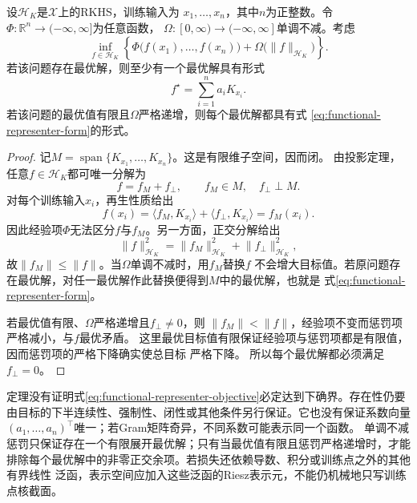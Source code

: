 \begin{theorem}[有限样本表示定理]
\label{thm:functional-representer-theorem}
设$\mathcal{H}_K$是$\mathcal{X}$上的RKHS，训练输入为
$x_1,\ldots,x_n$，其中$n$为正整数。令
$\Phi:\mathbb{R}^n\to(-\infty,\infty]$为任意函数，
$\Omega:[0,\infty)\to(-\infty,\infty]$单调不减。考虑
\begin{equation}
  \inf_{f\in\mathcal{H}_K}
  \left\{
    \Phi\bigl(f(x_1),\ldots,f(x_n)\bigr)
    +
    \Omega\bigl(\lVert f\rVert_{\mathcal{H}_K}\bigr)
  \right\}.
  \label{eq:functional-representer-objective}
\end{equation}
若该问题存在最优解，则至少有一个最优解具有形式
\begin{equation}
  f^\star
  =
  \sum_{i=1}^{n}a_iK_{x_i}.
  \label{eq:functional-representer-form}
\end{equation}
若该问题的最优值有限且$\Omega$严格递增，则每个最优解都具有式
\eqref{eq:functional-representer-form}的形式。
\end{theorem}

\begin{proof}
记$M=\operatorname{span}\{K_{x_1},\ldots,K_{x_n}\}$。这是有限维子空间，因而闭。
由投影定理，任意$f\in\mathcal{H}_K$都可唯一分解为
\[
  f=f_M+f_{\perp},\qquad f_M\in M,\quad f_{\perp}\perp M.
\]
对每个训练输入$x_i$，再生性质给出
\[
  f(x_i)
  =
  \langle f_M,K_{x_i}\rangle
  +
  \langle f_{\perp},K_{x_i}\rangle
  =
  f_M(x_i).
\]
因此经验项$\Phi$无法区分$f$与$f_M$。另一方面，正交分解给出
\[
  \lVert f\rVert_{\mathcal{H}_K}^2
  =
  \lVert f_M\rVert_{\mathcal{H}_K}^2
  +
  \lVert f_{\perp}\rVert_{\mathcal{H}_K}^2,
\]
故$\lVert f_M\rVert\leq\lVert f\rVert$。当$\Omega$单调不减时，用$f_M$替换$f$
不会增大目标值。若原问题存在最优解，对任一最优解作此替换便得到$M$中的最优解，也就是
式\eqref{eq:functional-representer-form}。

若最优值有限、$\Omega$严格递增且$f_{\perp}\neq0$，则
$\lVert f_M\rVert<\lVert f\rVert$，经验项不变而惩罚项严格减小，与$f$最优矛盾。
这里最优目标值有限保证经验项与惩罚项都是有限值，因而惩罚项的严格下降确实使总目标
严格下降。
所以每个最优解都必须满足$f_{\perp}=0$。
\end{proof}

定理没有证明式\eqref{eq:functional-representer-objective}必定达到下确界。存在性仍要
由目标的下半连续性、强制性、闭性或其他条件另行保证。它也没有保证系数向量
$(a_1,\ldots,a_n)^{\top}$唯一；若Gram矩阵奇异，不同系数可能表示同一个函数。
单调不减惩罚只保证存在一个有限展开最优解；只有当最优值有限且惩罚严格递增时，才能
排除每个最优解中的非零正交余项。若损失还依赖导数、积分或训练点之外的其他有界线性
泛函，表示空间应加入这些泛函的Riesz表示元，不能仍机械地只写训练点核截面。

